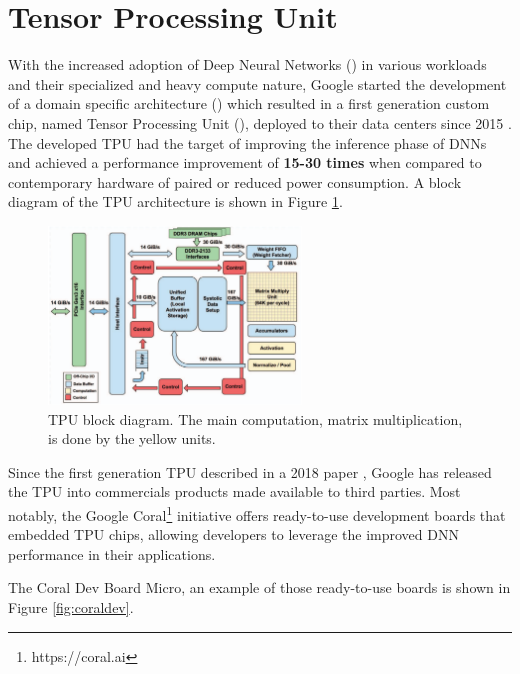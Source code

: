 \documentclass[openright]{normas-utf-tex} %
\begin{document}
\section{Tensor Processing Unit}
\label{sec:TPU}

With the increased adoption of Deep Neural Networks () 
in various workloads and their specialized and heavy compute nature, Google started the 
development of a domain specific architecture () 
which resulted in a first generation custom chip, named Tensor Processing Unit 
(), deployed to their data centers since 2015 \cite{Google2015}.
The developed TPU had the target of improving the inference phase of DNNs and
achieved a performance improvement of \textbf{15-30 times} when compared to
contemporary hardware of paired or reduced power consumption. A block diagram of the TPU
architecture is shown in Figure \ref{fig:tpuarch}.

\begin{figure}[H]
	\centering
	\includegraphics[width=0.6\textwidth]{./images/tpublock.png}
	\caption[TPU block diagram]{TPU block diagram. The main computation, matrix multiplication, is done by the yellow units.}
	\label{fig:tpuarch}
\end{figure}

Since the first generation TPU described in a 2018 paper \cite{Google2015},
Google has released the TPU into commercials products made available to third
parties. Most notably, the Google Coral\footnote{https://coral.ai} initiative
offers ready-to-use development boards that embedded TPU chips, allowing
developers to leverage the improved DNN performance in their applications.

The Coral Dev Board Micro, an example of those ready-to-use boards is shown in
Figure \ref{fig:coraldev}.
\end{document}
